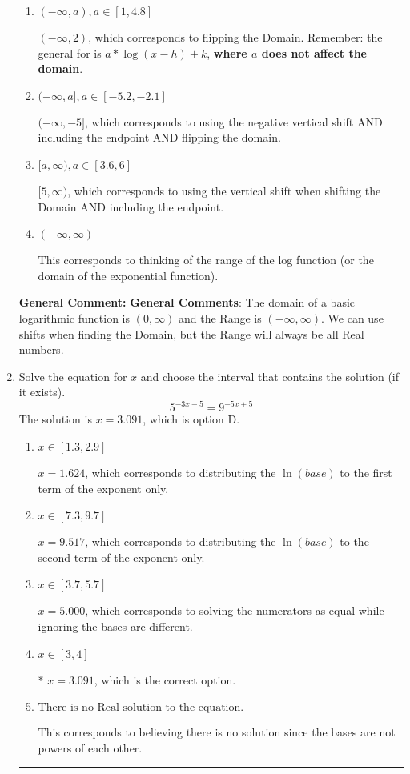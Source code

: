 \documentclass{extbook}[14pt]
\newcommand{\litem}[1]{\item #1

\rule{\textwidth}{0.4pt}}
\begin{document}
\begin{enumerate}
{\begin{enumerate}[label=\Alph*.]
* $(-2, \infty)$, which is the correct option.
\item \( (-\infty, a), a \in [1, 4.8] \)

$(-\infty, 2)$, which corresponds to flipping the Domain. Remember: the general for is $a*\log(x-h)+k$, \textbf{where $a$ does not affect the domain}.
\item \( (-\infty, a], a \in [-5.2, -2.1] \)

$(-\infty, -5]$, which corresponds to using the negative vertical shift AND including the endpoint AND flipping the domain.
\item \( [a, \infty), a \in [3.6, 6] \)

$[5, \infty)$, which corresponds to using the vertical shift when shifting the Domain AND including the endpoint.
\item \( (-\infty, \infty) \)

This corresponds to thinking of the range of the log function (or the domain of the exponential function).
\end{enumerate}

\textbf{General Comment:} \textbf{General Comments}: The domain of a basic logarithmic function is $(0, \infty)$ and the Range is $(-\infty, \infty)$. We can use shifts when finding the Domain, but the Range will always be all Real numbers.
}
\litem{
Solve the equation for $x$ and choose the interval that contains the solution (if it exists).
\[ 5^{-3x-5} = 9^{-5x+5} \]The solution is \( x = 3.091 \), which is option D.\begin{enumerate}[label=\Alph*.]
\item \( x \in [1.3, 2.9] \)

$x = 1.624$, which corresponds to distributing the $\ln(base)$ to the first term of the exponent only.
\item \( x \in [7.3, 9.7] \)

$x = 9.517$, which corresponds to distributing the $\ln(base)$ to the second term of the exponent only.
\item \( x \in [3.7, 5.7] \)

$x = 5.000$, which corresponds to solving the numerators as equal while ignoring the bases are different.
\item \( x \in [3, 4] \)

* $x = 3.091$, which is the correct option.
\item \( \text{There is no Real solution to the equation.} \)

This corresponds to believing there is no solution since the bases are not powers of each other.
\end{enumerate}

}
\end{enumerate}
\end{document}
